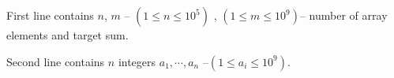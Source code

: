 First line contains $n$, $m$ -- $(1\le n\le 10^5)$ , $(1\le m\le 10^9)$-- number of array elements and target sum.

Second line contains $n$ integers $a_1,\cdots,a_n$ --$(1 \le a_i \le 10^9)$.
